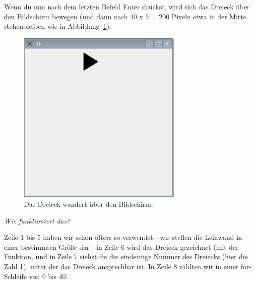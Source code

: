 Wenn du nun nach dem letzten Befehl Enter drückst, wird sich das Dreieck über den Bildschirm bewegen (und dann nach 40 x 5 = 200 Pixeln etwa in der Mitte stehenbleiben wie in Abbildung~\ref{fig44}).

\begin{figure}
\begin{center}
\includegraphics[width=80mm]{images/figure44}
\end{center}
\caption{Das Dreieck wandert über den Bildschirm.}\label{fig44}
\end{figure}

\par
\emph{Wie funktioniert das?}
\par
Zeile 1 bis 5 haben wir schon öfters so verwendet---wir stellen die Leinwand in einer bestimmten Größe dar---in Zeile 6 wird das Dreieck gezeichnet (mit der  Funktion, und in Zeile 7 siehst du die eindeutige Nummer des Dreiecks (hier die Zahl 1), unter der das Dreieck ansprechbar ist. In Zeile 8 zählten wir in einer for-Schleife von 0 bis 40.

